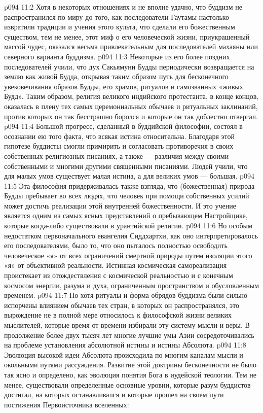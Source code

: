 \vs p094 11:2 \pc Хотя в некоторых отношениях и не вполне удачно, что буддизм не распространился по миру до того, как последователи Гаутамы настолько извратили традиции и учения этого культа, что сделали его божественным существом, тем не менее, этот миф о его человеческой жизни, приукрашенный массой чудес, оказался весьма привлекательным для последователей махаяны или северного варианта буддизма.
\vs p094 11:3 Некоторые из его более поздних последователей учили, что дух Сакьямуни Будды периодически возвращается на землю как живой Будда, открывая таким образом путь для бесконечного увековечивания образов Будды, его храмов, ритуалов и самозванных «живых Будд». Таким образом, религия великого индийского протестанта, в конце концов, оказалась в плену тех самых церемониальных обычаев и ритуальных заклинаний, против которых он так бесстрашно боролся и которые он так доблестно отвергал.
\vs p094 11:4 \pc Большой прогресс, сделанный в буддийской философии, состоял в осознании ею того факта, что всякая истина относительна. Благодаря этой гипотезе буддисты смогли примирить и согласовать противоречия в своих собственных религиозных писаниях, а также --- различия между своими собственными и многими другими священными писаниями. Людей учили, что для малых умов существует малая истина, а для великих умов --- большая.
\vs p094 11:5 Эта философия придерживалась также взгляда, что (божественная) природа Будды пребывает во всех людях, что человек при помощи собственных усилий может достичь реализации этой внутренней божественности. И это учение является одним из самых ясных представлений о пребывающем Настройщике, которые когда\hyp{}либо существовали в урантийской религии.
\vs p094 11:6 Но особым недостатком первоначального евангелия Сиддхартхи, как оно интерпретировалось его последователями, было то, что оно пыталось полностью освободить человеческое «я» от всех ограничений смертной природы путем изоляции этого «я» от объективной реальности. Истинная космическая самореализация проистекает из отождествления с космической реальностью и с конечным космосом энергии, разума и духа, ограниченным пространством и обусловленным временем.
\vs p094 11:7 Но хотя ритуалы и форма обрядов буддизма были сильно испорчены влиянием обычаев тех стран, в которых он распространялся, это вырождение не в полной мере относилось к философской жизни великих мыслителей, которые время от времени избирали эту систему мысли и веры. В продолжение более двух тысяч лет многие лучшие умы Азии сосредоточивались на проблеме установления абсолютной истины и истины Абсолюта.
\vs p094 11:8 Эволюция высокой идеи Абсолюта происходила по многим каналам мысли и окольными путями рассуждения. Развитие этой доктрины бесконечности не было так ясно и определено, как эволюция понятия Бога в иудейской теологии. Тем не менее, существовали определенные основные уровни, которые разум буддистов достигал, на которых останавливался и которые прошел на своем пути постижения Первоисточника вселенных:
